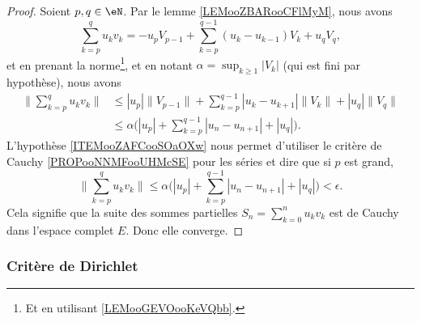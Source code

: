 \begin{proof}
	Soient \( p,q\in \eN\). Par le lemme \ref{LEMooZBARooCFlMyM}, nous avons
	\begin{equation}
		\sum_{k=p}^qu_kv_k=-u_pV_{p-1}+\sum_{k=p}^{q-1}(u_k-u_{k-1})V_k+u_qV_q,
	\end{equation}
	et en prenant la norme\footnote{Et en utilisant \ref{LEMooGEVOooKeVQbb}.}, et en notant \( \alpha=\sup_{k\geq 1}| V_k |\) (qui est fini par hypothèse), nous avons
	\begin{subequations}
		\begin{align}
			\| \sum_{k=p}^qu_kv_k \| & \leq | u_p |\| V_{p-1} \|+\sum_{k=p}^{q-1}| u_k-u_{k+1} |\| V_k \|+| u_q |\| V_q \| \\
			                         & \leq\alpha\Big( | u_p |+\sum_{k=p}^{q-1}| u_n-u_{n+1} |+| u_q | \Big).
		\end{align}
	\end{subequations}
	L'hypothèse \ref{ITEMooZAFCooSOaOXw} nous permet d'utiliser le critère de Cauchy \ref{PROPooNNMFooUHMcSE} pour les séries et dire que si \( p\) est grand,
	\begin{equation}
		\| \sum_{k=p}^qu_kv_k \|\leq \alpha\Big(  | u_p |+\sum_{k=p}^{q-1}| u_n-u_{n+1} |+| u_q | \Big)<\epsilon.
	\end{equation}
	Cela signifie que la suite des sommes partielles \( S_n=\sum_{k=0}^nu_kv_k\) est de Cauchy dans l'espace complet \( E\). Donc elle converge.
\end{proof}


\subsubsection{Critère de Dirichlet}



